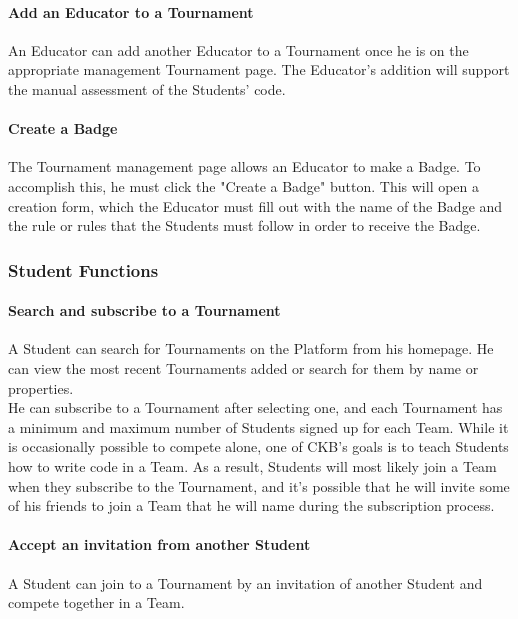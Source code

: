 \paragraph{Add an Educator to a Tournament}
An Educator can add another Educator to a Tournament once he is on the appropriate management Tournament page. The Educator's addition will support the manual assessment of the Students' code.
\paragraph{Create a Badge}
The Tournament management page allows an Educator to make a Badge. To accomplish this, he must click the "Create a Badge" button. This will open a creation form, which the Educator must fill out with the name of the Badge and the rule 
or rules that the Students must follow in order to receive the Badge.

\subsubsection{Student Functions}
\paragraph{Search and subscribe to a Tournament}
A Student can search for Tournaments on the Platform from his homepage. He can view the most recent Tournaments added or search for them by name or properties.\\
He can subscribe to a Tournament after selecting one, and each Tournament has a minimum and maximum number of Students signed up for each Team. While it is occasionally possible to compete alone, one of CKB's goals is to teach 
Students how to write code in a Team. As a result, Students will most likely join a Team when they subscribe to the Tournament, and it's possible that he will invite some of his friends to join a Team that he will name during the 
subscription process.
\paragraph{Accept an invitation from another Student}
A Student can join to a Tournament by an invitation of another Student and compete together in a Team.

